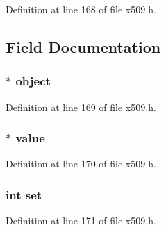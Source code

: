 Definition at line 168 of file x509.\+h.



\subsection{Field Documentation}
\subsubsection[{\texorpdfstring{object}{object}}]{ $\ast$ object}\hypertarget{struct_x509__name__entry__st_aac268aa1904733da5af63d97def610c4}{}\label{struct_x509__name__entry__st_aac268aa1904733da5af63d97def610c4}


Definition at line 169 of file x509.\+h.

\subsubsection[{\texorpdfstring{value}{value}}]{ $\ast$ value}\hypertarget{struct_x509__name__entry__st_a2d01db82068d723c43e919ae384a61f5}{}\label{struct_x509__name__entry__st_a2d01db82068d723c43e919ae384a61f5}


Definition at line 170 of file x509.\+h.

\subsubsection[{\texorpdfstring{set}{set}}]{\setlength{\rightskip}{0pt plus 5cm}int set}\hypertarget{struct_x509__name__entry__st_abc95fb2bad5b94ceca590f7dacd269b5}{}\label{struct_x509__name__entry__st_abc95fb2bad5b94ceca590f7dacd269b5}


Definition at line 171 of file x509.\+h.

